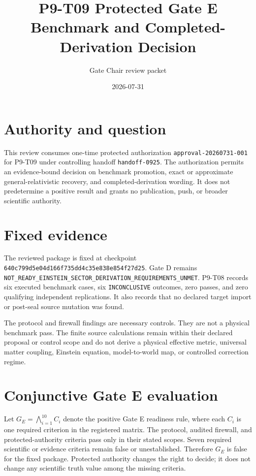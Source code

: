 \documentclass[11pt]{article}
\title{P9-T09 Protected Gate E Benchmark and Completed-Derivation Decision}
\author{Gate Chair review packet}
\date{2026-07-31}
\begin{document}
\maketitle

\section{Authority and question}

This review consumes one-time protected authorization
\texttt{approval-20260731-001} for P9-T09 under controlling handoff
\texttt{handoff-0925}.  The authorization permits an evidence-bound decision
on benchmark promotion, exact or approximate general-relativistic recovery,
and completed-derivation wording.  It does not predetermine a positive result
and grants no publication, push, or broader scientific authority.

\section{Fixed evidence}

The reviewed package is fixed at checkpoint
\texttt{640c799d5e04d166f735dd4c35e838e854f27d25}.  Gate D remains
\texttt{NOT\_READY\_EINSTEIN\_SECTOR\_DERIVATION\_REQUIREMENTS\_UNMET}.
P9-T08 records six executed benchmark cases, six \texttt{INCONCLUSIVE}
outcomes, zero passes, and zero qualifying independent replications.  It also
records that no declared target import or post-seal source mutation was found.

The protocol and firewall findings are necessary controls.  They are not a
physical benchmark pass.  The finite source calculations remain within their
declared proposal or control scope and do not derive a physical effective
metric, universal matter coupling, Einstein equation, model-to-world map, or
controlled correction regime.

\section{Conjunctive Gate E evaluation}

Let $G_E=\bigwedge_{i=1}^{10} C_i$ denote the positive Gate E readiness rule,
where each $C_i$ is one required criterion in the registered matrix.  The
protocol, audited firewall, and protected-authority criteria pass only in
their stated scopes.  Seven required scientific or evidence criteria remain
false or unestablished.  Therefore $G_E$ is false for the fixed package.
Protected authority changes the right to decide; it does not change any
scientific truth value among the missing criteria.
\end{document}
